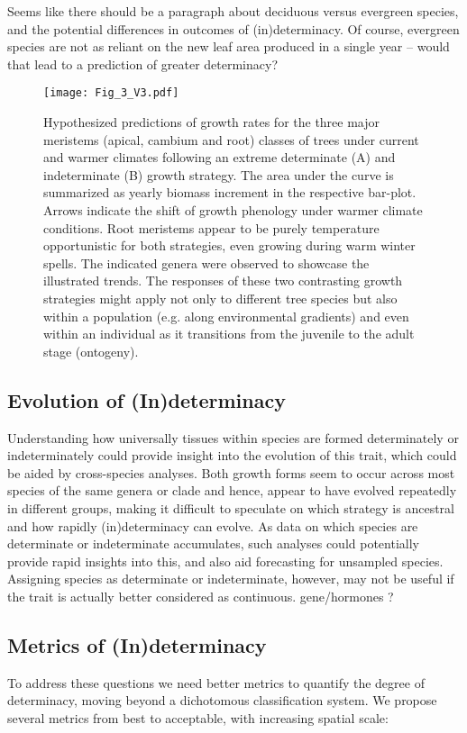 \documentclass{article}
\begin{document}
 Seems like there should be a paragraph about deciduous versus evergreen species, and the potential differences in outcomes of (in)determinacy. Of course, evergreen species are not as reliant on the new leaf area produced in a single year – would that lead to a prediction of greater determinacy?

							\begin{figure}
							\centering
							\texttt{[image: Fig\_3\_V3.pdf]} 
							\caption{Hypothesized predictions of growth rates for the three major meristems (apical, cambium and root) classes of trees under current and warmer climates following an extreme determinate (A) and indeterminate (B) growth strategy. The area under the curve is summarized as yearly biomass increment in the respective bar-plot. Arrows indicate the shift of growth phenology under warmer climate conditions. Root meristems appear to be purely temperature opportunistic for both strategies, even growing during warm winter spells. The indicated genera were observed to showcase the illustrated trends. The responses of these two contrasting growth strategies might apply not only to different tree species but also within a population (e.g. along environmental gradients) and even within an individual as it transitions from the juvenile to the adult stage (ontogeny).}
							\label{fig:fig_3xxx}
						\end{figure}

	\subsection*{Evolution of (In)determinacy}
	Understanding how universally tissues within species are formed determinately or indeterminately could provide insight into the evolution of this trait, which could be aided by cross-species analyses. Both growth forms seem to occur across most species of the same genera or clade and hence, appear to have evolved repeatedly in different groups, making it difficult to speculate on which strategy is ancestral \citep[but see][]{hariharanIndeterminateGrowthCould2016} and how rapidly (in)determinacy can evolve. As data on which species are determinate or indeterminate accumulates, such analyses could potentially provide rapid insights into this, and also aid forecasting for unsampled species. Assigning species as determinate or indeterminate, however, may not be useful if the trait is actually better considered as continuous. 
	gene/hormones ?
	
	\subsection*{Metrics of (In)determinacy}
	To address these questions we need better metrics to quantify the degree of determinacy, moving beyond a dichotomous classification system. We propose several metrics from best to acceptable, with increasing spatial scale: \\
	
\end{document}

